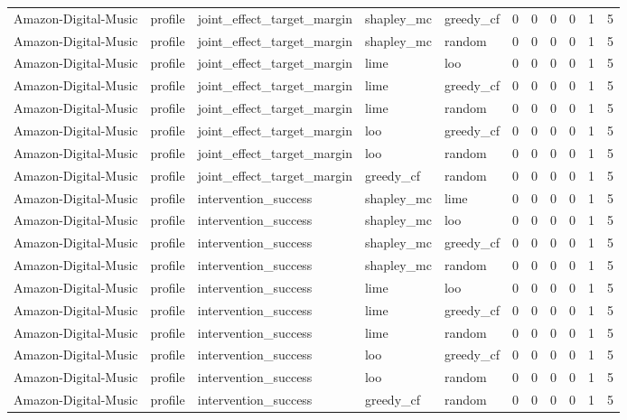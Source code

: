\begin{table}[t]
{\begin{tabular}{lllllrrrrrr}
Amazon-Digital-Music & profile & joint\_effect\_target\_margin & shapley\_mc & greedy\_cf & 0 & 0 & 0 & 0 & 1 & 5 \\
Amazon-Digital-Music & profile & joint\_effect\_target\_margin & shapley\_mc & random & 0 & 0 & 0 & 0 & 1 & 5 \\
Amazon-Digital-Music & profile & joint\_effect\_target\_margin & lime & loo & 0 & 0 & 0 & 0 & 1 & 5 \\
Amazon-Digital-Music & profile & joint\_effect\_target\_margin & lime & greedy\_cf & 0 & 0 & 0 & 0 & 1 & 5 \\
Amazon-Digital-Music & profile & joint\_effect\_target\_margin & lime & random & 0 & 0 & 0 & 0 & 1 & 5 \\
Amazon-Digital-Music & profile & joint\_effect\_target\_margin & loo & greedy\_cf & 0 & 0 & 0 & 0 & 1 & 5 \\
Amazon-Digital-Music & profile & joint\_effect\_target\_margin & loo & random & 0 & 0 & 0 & 0 & 1 & 5 \\
Amazon-Digital-Music & profile & joint\_effect\_target\_margin & greedy\_cf & random & 0 & 0 & 0 & 0 & 1 & 5 \\
Amazon-Digital-Music & profile & intervention\_success & shapley\_mc & lime & 0 & 0 & 0 & 0 & 1 & 5 \\
Amazon-Digital-Music & profile & intervention\_success & shapley\_mc & loo & 0 & 0 & 0 & 0 & 1 & 5 \\
Amazon-Digital-Music & profile & intervention\_success & shapley\_mc & greedy\_cf & 0 & 0 & 0 & 0 & 1 & 5 \\
Amazon-Digital-Music & profile & intervention\_success & shapley\_mc & random & 0 & 0 & 0 & 0 & 1 & 5 \\
Amazon-Digital-Music & profile & intervention\_success & lime & loo & 0 & 0 & 0 & 0 & 1 & 5 \\
Amazon-Digital-Music & profile & intervention\_success & lime & greedy\_cf & 0 & 0 & 0 & 0 & 1 & 5 \\
Amazon-Digital-Music & profile & intervention\_success & lime & random & 0 & 0 & 0 & 0 & 1 & 5 \\
Amazon-Digital-Music & profile & intervention\_success & loo & greedy\_cf & 0 & 0 & 0 & 0 & 1 & 5 \\
Amazon-Digital-Music & profile & intervention\_success & loo & random & 0 & 0 & 0 & 0 & 1 & 5 \\
Amazon-Digital-Music & profile & intervention\_success & greedy\_cf & random & 0 & 0 & 0 & 0 & 1 & 5 \\

\end{tabular}}
\end{table}
